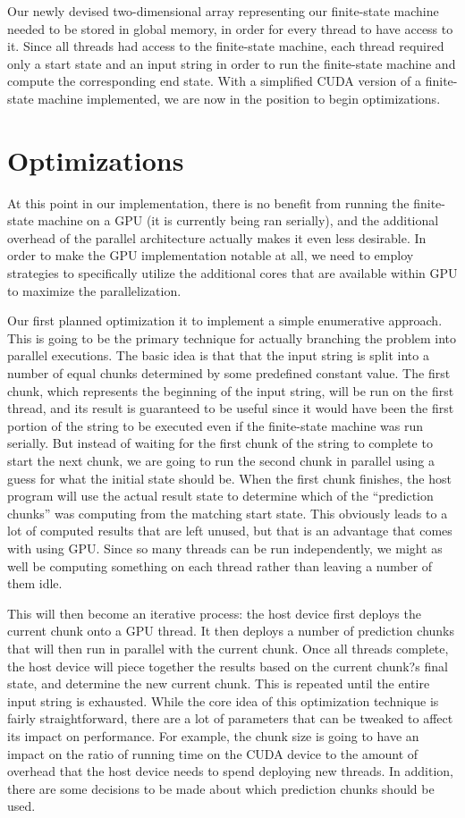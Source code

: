 \documentclass[11pt]{sigplanconf}
\begin{document}
Our newly devised two-dimensional array representing our finite-state machine needed to be stored in global memory, in order for every thread to have access to it. Since all threads had access to the finite-state machine, each thread required only a start state and an input string in order to run the finite-state machine and compute the corresponding end state. With a simplified CUDA version of a finite-state machine implemented, we are now in the position to begin optimizations.

\section{Optimizations}

At this point in our implementation, there is no benefit from running the finite-state machine on a GPU (it is currently being ran serially), and the additional overhead of the parallel architecture actually makes it even less desirable. In order to make the GPU implementation notable at all, we need to employ strategies to specifically utilize the additional cores that are available within GPU to maximize the parallelization. 

Our first planned optimization it to implement a simple enumerative approach. This is going to be the primary technique for actually branching the problem into parallel executions. The basic idea is that that the input string is split into a number of equal chunks determined by some predefined constant value. The first chunk, which represents the beginning of the input string, will be run on the first thread, and its result is guaranteed to be useful since it would have been the first portion of the string to be executed even if the finite-state machine was run serially. But instead of waiting for the first chunk of the string to complete to start the next chunk, we are going to run the second chunk in parallel using a guess for what the initial state should be. When the first chunk finishes, the host program will use the actual result state to determine which of the ``prediction chunks'' was computing from the matching start state. This obviously leads to a lot of computed results that are left unused, but that is an advantage that comes with using GPU. Since so many threads can be run independently, we might as well be computing something on each thread rather than leaving a number of them idle. 

This will then become an iterative process: the host device first deploys the current chunk onto a GPU thread. It then deploys a number of prediction chunks that will then run in parallel with the current chunk. Once all threads complete, the host device will piece together the results based on the current chunk?s final state, and determine the new current chunk. This is repeated until the entire input string is exhausted. While the core idea of this optimization technique is fairly straightforward, there are a lot of parameters that can be tweaked to affect its impact on performance. For example, the chunk size is going to have an impact on the ratio of running time on the CUDA device to the amount of overhead that the host device needs to spend deploying new threads. In addition, there are some decisions to be made about which prediction chunks should be used. 
\end{document}
